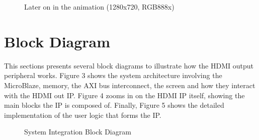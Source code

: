 \documentclass[12pt]{article}
\begin{document}
\begin{enumerate}
\begin{figure}[h!]
      \end{figure}
      \newpage
      \begin{figure}[h!]
        \centering
        \caption{Later on in the animation (1280x720, RGB888x)}
      \end{figure}
  \end{enumerate}
  \section{Block Diagram}
  This sections presents several block diagrams to illustrate how the HDMI output peripheral
  works. Figure 3 shows the system architecture involving the MicroBlaze,
  memory, the AXI bus interconnect, the screen and how they interact with the HDMI out IP.
  Figure 4 zooms in on the HDMI IP itself, showing the main blocks the IP is
  composed of. Finally, Figure 5 shows the detailed implementation of the
  user logic that forms the IP.
	\begin{figure}
	\centering
	\caption{System Integration Block Diagram}
	\end{figure}
\end{document}
